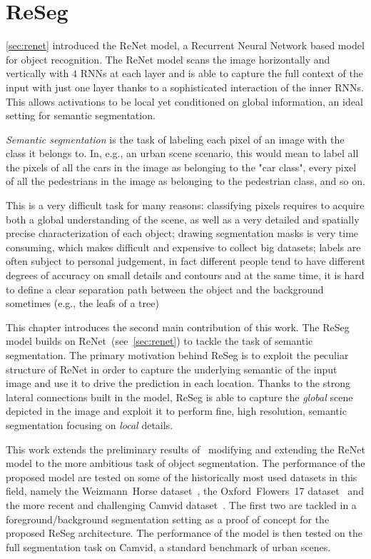 \chapter{ReSeg}\label{sec:reseg}

\autoref{sec:renet} introduced the ReNet model, a Recurrent Neural Network
based model for object recognition. The ReNet model scans the image
horizontally and vertically with $4$ RNNs at each layer and is able to capture
the full context of the input with just one layer thanks to a sophisticated
interaction of the inner RNNs. This allows activations to be local yet
conditioned on global information, an ideal setting for semantic segmentation.

\emph{Semantic segmentation} is the task of labeling each pixel of an image
with the class it belongs to. In, e.g., an urban scene scenario, this would
mean to label all the pixels of all the cars in the image as belonging to the
"car class", every pixel of all the pedestrians in the image as belonging to
the pedestrian class, and so on.

This is a very difficult task for many reasons: classifying pixels requires to
acquire both a global understanding of the scene, as well as a very detailed
and spatially precise characterization of each object; drawing segmentation
masks is very time consuming, which makes difficult and expensive to collect
big datasets; labels are often subject to personal judgement, in fact different
people tend to have different degrees of accuracy on small details and
contours and at the same time, it is hard to define a clear separation path
between the object and the background sometimes (e.g., the leafs of a tree)


This chapter introduces the second main contribution of this work. The ReSeg
model builds on ReNet~(see~\autoref{sec:renet}) to tackle the task of semantic
segmentation. The primary motivation behind ReSeg is to exploit the peculiar
structure of ReNet in order to capture the underlying semantic of the input
image and use it to drive the prediction in each location. Thanks to the strong
lateral connections built in the model, ReSeg is able to capture the
\emph{global} scene depicted in the image and exploit it to perform fine,
high resolution, semantic segmentation focusing on \emph{local} details.

This work extends the preliminary results of~\cite{visin2015renet} modifying
and extending the ReNet model to the more ambitious task of object
segmentation. The performance of the proposed model are tested on some of the
historically most used datasets in this field, namely the Weizmann~Horse
dataset~\cite{Borenstein04combiningtop-down}, the Oxford~Flowers~17
dataset~\cite{Nilsback06} and the more recent and challenging Camvid
dataset~\citep{Brostow2010semantic,BrostowECCV08}. The first two are
tackled in a foreground/background segmentation setting as a proof of concept
for the proposed ReSeg architecture. The performance of the model is then
tested on the full segmentation task on Camvid, a standard benchmark of urban
scenes.

